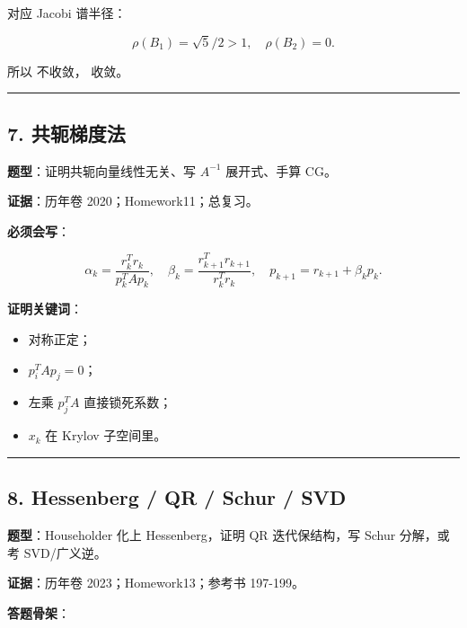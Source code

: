 \documentclass[11pt,a4paper]{ctexart}
\newcommand{\code}[1]{\begingroup\ttfamily\small #1\endgroup}
\begin{document}
对应 Jacobi 谱半径：

\[
\rho(B_1)=\sqrt5/2>1,\quad \rho(B_2)=0.
\]

所以 \code{} 不收敛，\code{} 收敛。

\bigskip\hrule\bigskip


\subsection*{7. 共轭梯度法}


\textbf{题型}：证明共轭向量线性无关、写 $A^{-1}$ 展开式、手算 CG。

\textbf{证据}：历年卷 2020；Homework11；总复习。

\textbf{必须会写}：

\[
\alpha_k=\frac{r_k^Tr_k}{p_k^TAp_k},\quad
\beta_k=\frac{r_{k+1}^Tr_{k+1}}{r_k^Tr_k},\quad
p_{k+1}=r_{k+1}+\beta_k p_k.
\]

\textbf{证明关键词}：

\begin{itemize}

\item \code{} 对称正定；

\item $p_i^T A p_j = 0$；

\item 左乘 $p_j^T A$ 直接锁死系数；

\item $x_k$ 在 Krylov 子空间里。

\end{itemize}

\bigskip\hrule\bigskip


\subsection*{8. Hessenberg / QR / Schur / SVD}


\textbf{题型}：Householder 化上 Hessenberg，证明 QR 迭代保结构，写 Schur 分解，或考 SVD/广义逆。

\textbf{证据}：历年卷 2023；Homework13；参考书 197-199。

\textbf{答题骨架}：
\end{document}
